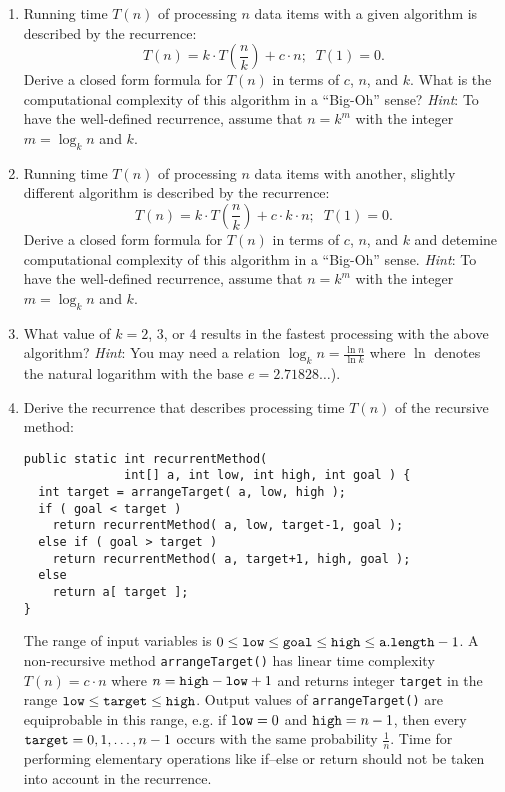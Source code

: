 \documentclass[]{article}
\begin{document}
\begin{enumerate}

\item Running time $T(n)$ of processing $n$ data items
with a given algorithm is described by the recurrence:
\[
T(n) = k\cdot T \left ( \frac{n}{k} \right ) + c \cdot n; \;\;
T(1) = 0.
\]
Derive a closed form formula
for $T(n)$ in terms of $c$, $n$, and $k$. What is the computational 
complexity of this algorithm in a ``Big-Oh'' sense? 
\emph{Hint}: To have the well-defined recurrence, 
assume that
$n = k^{m}$ with the integer $m= \log_{k}n$ and $k$.\\

\item Running time \(T(n)\) of processing $n$ data items
with another, slightly different algorithm 
is described by the recurrence:
\[
T(n) = k \cdot T \left ( \frac{n}{k} \right ) + c \cdot k \cdot n; \;\;
T(1) = 0.
\]
Derive a closed form formula
for $T(n)$ in terms of $c$, $n$, and $k$ and detemine computational 
complexity of this algorithm in a ``Big-Oh'' sense.
\emph{Hint}: To have the well-defined recurrence, 
assume that
$n = k^{m}$ with the integer $m= \log_{k}n$ and $k$.\\

\item What value of $k=2$, $3$, or $4$ results in
the fastest processing with the above algorithm?
\emph{Hint}: You may need a relation $\log_{k}n = \frac{\ln n}{\ln k}$ where
$\ln$ denotes the natural logarithm with the base $e=2.71828\ldots$).\\

\item Derive the recurrence that describes 
processing time \(T(n)\) of the recursive method:
\begin{verbatim}
public static int recurrentMethod( 
              int[] a, int low, int high, int goal ) {  
  int target = arrangeTarget( a, low, high );
  if ( goal < target )
    return recurrentMethod( a, low, target-1, goal );
  else if ( goal > target )
    return recurrentMethod( a, target+1, high, goal );
  else 
    return a[ target ];  
}
\end{verbatim}
The
range of input variables is
\(0 \le {\tt low} \le {\tt goal} \le {\tt high} \le {\tt a.length}-1\).
A non-recursive method {\tt arrangeTarget()} has linear time complexity
\(T(n)= c\cdot n\) where \(n = {\tt high} - {\tt low} + 1\)
and returns integer {\tt target} in the range 
\({\tt low} \le {\tt target} \le {\tt high}\). Output
values of {\tt arrangeTarget()} 
are equiprobable in this range, e.g. if
\({\tt low}=0\) and \({\tt high} = n-1\), then every
\({\tt target} = 0, 1, \ldots, n-1\) occurs
with the same probability \(\frac{1}{n}\). Time for 
performing elementary operations like if--else or
return should not be taken into account in the recurrence. \\


\end{enumerate}
\end{document}
